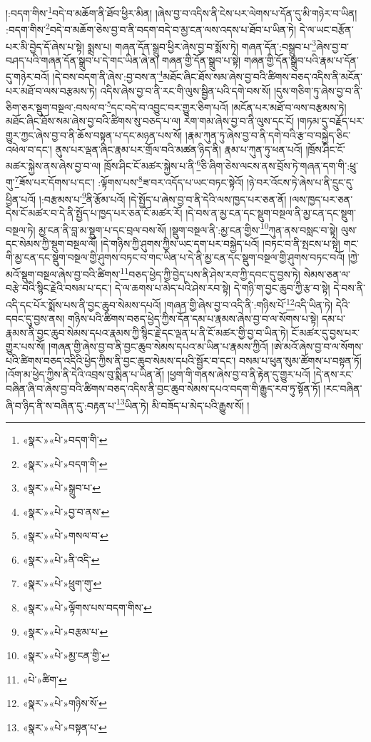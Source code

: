 །:བདག་གིས་\footnote{«སྣར་»«པེ་»བདག་གི་}བདེ་བ་མཆོག་ནི་ཐོབ་ཕྱིར་མིན། །ཞེས་བྱ་བ་འདིས་ནི་ངེས་པར་ལེགས་པ་དོན་དུ་མི་གཉེར་བ་ཡིན། :བདག་གིས་\footnote{«སྣར་»«པེ་»བདག་གི་}བདེ་བ་མཆོག་ཅེས་བྱ་བ་ནི་བདག་བདེ་བ་མྱ་ངན་ལས་འདས་པ་ཐོབ་པ་ཡིན་ཏེ། དེ་ལ་ཡང་བརྩོན་པར་མི་བྱེད་དོ་ཞེས་པ་སྟེ། སྨྲས་པ། གཞན་དོན་སྒྲུབ་ཕྱིར་ཞེས་བྱ་བ་སྨོས་ཏེ། གཞན་དོན་:བསྒྲུབ་པ་\footnote{«སྣར་»«པེ་»སྒྲུབ་པ་}ཞེས་བྱ་བ་བཤད་པའི་གཞན་དོན་སྒྲུབ་པ་དེ་གང་ཡིན་ཞེ་ན། གཞན་གྱི་དོན་སྒྲུབ་པ་སྟེ། གཞན་གྱི་དོན་སྒྲུབ་པའི་རྣམ་པ་དོན་དུ་གཉེར་བའོ། །དེ་བས་བདག་ནི་ཞེས་:བྱ་བས་ན་\footnote{«སྣར་»«པེ་»བྱ་བ་ནས་}མཐོང་ཞིང་ཐོས་སམ་ཞེས་བྱ་བའི་ཚིགས་བཅད་འདིས་ནི་མངོན་པར་མཐོ་བ་ལས་བརྩམས་ཏེ། འདིས་ཞེས་བྱ་བ་ནི་རང་གི་ལུས་སྦྱིན་པའི་དགེ་བས་སོ། །དུས་གཅིག་ཏུ་ཞེས་བྱ་བ་ནི་ཅིག་ཅར་སྡུག་བསྔལ་:བསལ་བ་\footnote{«སྣར་»«པེ་»གསལ་བ་}དང་བདེ་བ་འབྱུང་བར་གྱུར་ཅིག་པའོ། །མངོན་པར་མཐོ་བ་ལས་བརྩམས་ཏེ། མཐོང་ཞིང་ཐོས་སམ་ཞེས་བྱ་བའི་ཚིགས་སུ་བཅད་པ་ལ། རེག་གམ་ཞེས་བྱ་བ་ནི་ལུས་དང་ངོ། །གཏམ་དུ་བརྗོད་པར་གྱུར་ཀྱང་ཞེས་བྱ་བ་ནི་ཆོས་བསྟན་པ་དང་མཉན་པས་སོ། །རྣམ་ཀུན་ཏུ་ཞེས་བྱ་བ་ནི་དགེ་བའི་རྩ་བ་བསྐྱེད་ཅིང་འཕེལ་བ་དང་། ནུས་པར་ལྡན་ཞིང་རྣམ་པར་གྲོལ་བའི་མཚན་ཉིད་ནི། རྣམ་པ་ཀུན་ཏུ་ཕན་པའོ། །ཁྲོས་ཤིང་ངོ་མཚར་སྐྱེས་ནས་ཞེས་བྱ་བ་ལ། ཁྲོས་ཤིང་ངོ་མཚར་སྐྱེས་པ་ནི་\footnote{«སྣར་»«པེ་»ནི་འདི་}ཅི་ཞིག་ཅེས་ལངས་ནས་བྲོས་ཏེ་གཞན་དག་གི་:ཕྲུ་གུ་\footnote{«སྣར་»«པེ་»ཕྲུག་གུ་}ཟོས་པར་དོགས་པ་དང་། :ལྟོགས་པས་\footnote{«སྣར་»«པེ་»ལྟོགས་པས་བདག་གིས་}ཟ་བར་འདོད་པ་ཡང་བཏང་སྟེའོ། །ཉེ་བར་འོངས་ཏེ་ཞེས་པ་ནི་དྲུང་དུ་ཕྱིན་པའོ། །:བརྩམས་པ་\footnote{«སྣར་»«པེ་»བརྩམ་པ་}ནི་རྩོམ་པའོ། །དེ་སྤྱོད་པ་ཞེས་བྱ་བ་ནི་དེའི་ལས་ཁྱད་པར་ཅན་ནོ། །ལས་ཁྱད་པར་ཅན་དེས་ངོ་མཚར་བ་དེ་ནི་སྤྱོད་པ་ཁྱད་པར་ཅན་ངོ་མཚར་རོ། །དེ་བས་ན་མྱ་ངན་དང་སྡུག་བསྔལ་ནི་མྱ་ངན་དང་སྡུག་བསྔལ་ཏེ། མྱ་ངན་ནི་བླ་མ་སྡུག་པ་དང་བྲལ་བས་སོ། །སྡུག་བསྔལ་ནི་:མྱ་ངན་གྱིས་\footnote{«སྣར་»«པེ་»མྱ་ངན་གྱི་}ཀུན་ནས་བསླང་བ་སྟེ། ལུས་དང་སེམས་ཀྱི་སྡུག་བསྔལ་ལོ། །དེ་གཉིས་ཀྱི་ཤུགས་ཀྱིས་ཡང་དག་པར་བསྐྱེད་པའོ། །བཏང་བ་ནི་སྤངས་པ་སྟེ། གང་གི་མྱ་ངན་དང་སྡུག་བསྔལ་གྱི་ཤུགས་བཏང་བ་གང་ཡིན་པ་དེ་ནི་མྱ་ངན་དང་སྡུག་བསྔལ་གྱི་ཤུགས་བཏང་བའོ། །ཀྱེ་མའོ་སྡུག་བསྔལ་ཞེས་བྱ་བའི་ཚིགས་\footnote{«པེ་»ཚིག་}བཅད་ཕྱེད་ཀྱི་བྱེད་པས་ནི་ཤེས་རབ་ཀྱི་དབང་དུ་བྱས་ཏེ། སེམས་ཅན་ལ་བརྩེ་བའི་སྙིང་རྗེའི་བསམ་པ་དང་། དེ་ལ་ཆགས་པ་མེད་པའི་ཤེས་རབ་སྟེ། དེ་གཉི་ག་བྱང་ཆུབ་ཀྱི་རྩ་བ་སྟེ། དེ་བས་ནི་འདི་དང་པོར་སྨོས་པས་ནི་བྱང་ཆུབ་སེམས་དཔའོ། །གཞན་གྱི་ཞེས་བྱ་བ་འདི་ནི་:གཉིས་པོ་\footnote{«སྣར་»«པེ་»གཉིས་སོ་}འདི་ཡིན་ཏེ། དེའི་དབང་དུ་བྱས་ནས། གཉིས་པའི་ཚིགས་བཅད་ཕྱེད་ཀྱིས་དོན་དམ་པ་རྣམས་ཞེས་བྱ་བ་ལ་སོགས་པ་སྟེ། དམ་པ་རྣམས་ནི་བྱང་ཆུབ་སེམས་དཔའ་རྣམས་ཀྱི་སྙིང་རྗེ་དང་ལྡན་པ་ནི་ངོ་མཚར་གྱི་བྱ་བ་ཡིན་ཏེ། ངོ་མཚར་དུ་བྱས་པར་གྱུར་པས་སོ། །གཞན་གྱི་ཞེས་བྱ་བ་ནི་བྱང་ཆུབ་སེམས་དཔའ་མ་ཡིན་པ་རྣམས་ཀྱིའོ། །ཨེ་མའོ་ཞེས་བྱ་བ་ལ་སོགས་པའི་ཚིགས་བཅད་འདིའི་ཕྱེད་ཀྱིས་ནི་བྱང་ཆུབ་སེམས་དཔའི་སྦྱོར་བ་དང་། བསམ་པ་ཕུན་སུམ་ཚོགས་པ་བསྟན་ཏོ། །འོག་མ་ཕྱེད་ཀྱིས་ནི་དེའི་འབྲས་བུ་སྨིན་པ་ཡིན་ནོ། །ཕྱག་གི་གནས་ཞེས་བྱ་བ་ནི་རྟེན་དུ་གྱུར་པའོ། །དེ་ནས་རང་བཞིན་ཞི་བ་ཞེས་བྱ་བའི་ཚིགས་བཅད་འདིས་ནི་བྱང་ཆུབ་སེམས་དཔའ་བདག་གི་རྒྱུད་རབ་ཏུ་སྟོན་ཏོ། །རང་བཞིན་ཞི་བ་ཉིད་ནི་ས་བཞིན་དུ་:བརྟན་པ་\footnote{«སྣར་»«པེ་»བསྟན་པ་}ཡིན་ཏེ། མི་བཟོད་པ་མེད་པའི་རྒྱུས་སོ། །
